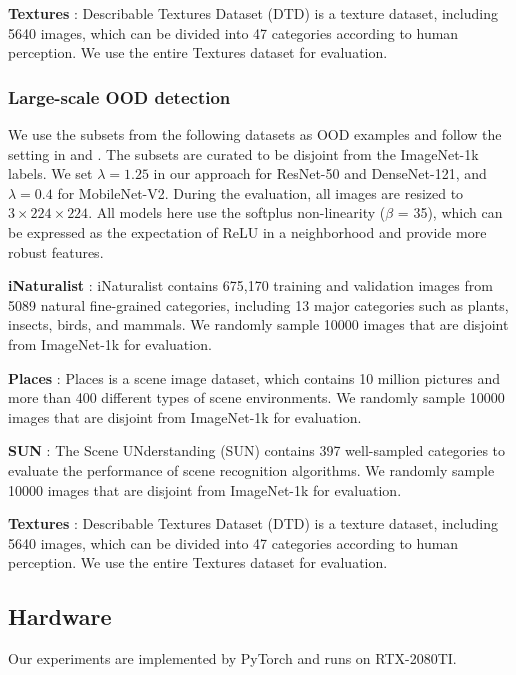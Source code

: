 \documentclass{article}
\begin{document}
\textbf{Textures} \cite{cimpoi2014Texture}: Describable Textures Dataset (DTD) is a texture dataset, including 5640 images, which can be divided into 47 categories according to human perception. We use the entire Textures dataset for evaluation.

\subsubsection{Large-scale OOD detection}

We use the subsets from the following datasets as OOD examples and follow the setting in \cite{sun2021react} and \cite{huang2021importance}. The subsets are curated to be disjoint from the ImageNet-1k labels. We set $\lambda=1.25$ in our approach for ResNet-50 and DenseNet-121, and $\lambda=0.4$ for MobileNet-V2. During the evaluation, all images are resized to $3 \times 224 \times 224$. All models here use the softplus non-linearity ($\beta$ = 35), which can be expressed as the expectation of ReLU in a neighborhood \cite{zhu2022rethinking} and provide more robust features.

\textbf{iNaturalist} \cite{van2018inaturalist}: iNaturalist contains 675,170 training and validation images from 5089 natural fine-grained categories, including 13 major categories such as plants, insects, birds, and mammals. We randomly sample 10000 images that are disjoint from ImageNet-1k for evaluation.

\textbf{Places} \cite{zhou2017places}: Places is a scene image dataset, which contains 10 million pictures and more than 400 different types of scene environments. We randomly sample 10000 images that are disjoint from ImageNet-1k for evaluation.

\textbf{SUN} \cite{xiao2010sun}: The Scene UNderstanding (SUN) contains 397 well-sampled categories to evaluate the performance of scene recognition algorithms. We randomly sample 10000 images that are disjoint from ImageNet-1k for evaluation.

\textbf{Textures} \cite{cimpoi2014Texture}: Describable Textures Dataset (DTD) is a texture dataset, including 5640 images, which can be divided into 47 categories according to human perception. We use the
entire Textures dataset for evaluation.


\subsection{Hardware}
Our experiments are implemented by PyTorch \cite{pytorch} and runs on RTX-2080TI.
\end{document}
